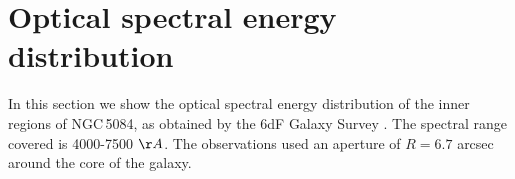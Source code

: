 \documentclass[modern]{CORE-AAS/aastex631}
\begin{document}
\section{Optical spectral energy distribution} 
\label{Appendix:OpticalSpectra}
In this section we show the optical spectral energy distribution of the inner regions of NGC\,5084, as obtained by the 6dF Galaxy Survey \citep{jones+2004mnras355_747}. The spectral range covered is 4000-7500 $\AA$. The observations used an aperture of $R=6.7$ arcsec around the core of the galaxy. 

{}
{}%
{}
\end{document}

